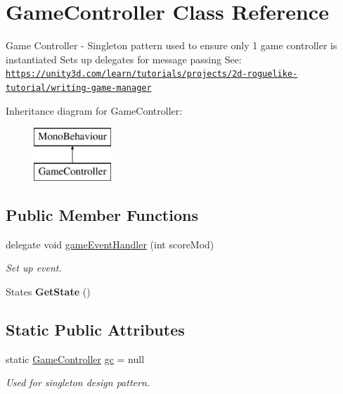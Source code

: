 \hypertarget{class_game_controller}{}\section{Game\+Controller Class Reference}
\label{class_game_controller}


Game Controller -\/ Singleton pattern used to ensure only 1 game controller is instantiated Sets up delegates for message passing See\+: \href{https://unity3d.com/learn/tutorials/projects/2d-roguelike-tutorial/writing-game-manager}{\tt https\+://unity3d.\+com/learn/tutorials/projects/2d-\/roguelike-\/tutorial/writing-\/game-\/manager}  


Inheritance diagram for Game\+Controller\+:\begin{figure}[H]
\begin{center}
\leavevmode
\includegraphics[height=2.000000cm]{class_game_controller}
\end{center}
\end{figure}
\subsection*{Public Member Functions}
\begin{DoxyCompactItemize}
\item 
delegate void \hyperlink{class_game_controller_a5729636ec46fe598b2ee7515df81b216}{game\+Event\+Handler} (int score\+Mod)\hypertarget{class_game_controller_a5729636ec46fe598b2ee7515df81b216}{}\label{class_game_controller_a5729636ec46fe598b2ee7515df81b216}

\begin{DoxyCompactList}\small\item\em Set up event. \end{DoxyCompactList}\item 
States {\bfseries Get\+State} ()\hypertarget{class_game_controller_a699a9e7d594774992e69abeb125a3dbd}{}\label{class_game_controller_a699a9e7d594774992e69abeb125a3dbd}

\end{DoxyCompactItemize}
\subsection*{Static Public Attributes}
\begin{DoxyCompactItemize}
\item 
static \hyperlink{class_game_controller}{Game\+Controller} \hyperlink{class_game_controller_a2c1ce3edd91a601cebe63b519af869b6}{gc} = null\hypertarget{class_game_controller_a2c1ce3edd91a601cebe63b519af869b6}{}\label{class_game_controller_a2c1ce3edd91a601cebe63b519af869b6}

\begin{DoxyCompactList}\small\item\em Used for singleton design pattern. \end{DoxyCompactList}\end{DoxyCompactItemize}
